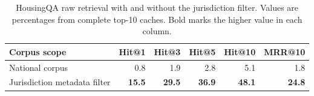 \begin{table}[H]
\centering
\caption{HousingQA raw retrieval with and without the jurisdiction filter. Values are percentages from complete top-10 caches. Bold marks the higher value in each column.}
\label{tab:housing_metadata_filter}
\footnotesize
\begin{tabular}{lrrrrr}
\toprule
Corpus scope & Hit@1 & Hit@3 & Hit@5 & Hit@10 & MRR@10 \\
\midrule
National corpus & 0.8 & 1.9 & 2.8 & 5.1 & 1.8 \\
Jurisdiction metadata filter & \textbf{15.5} & \textbf{29.5} & \textbf{36.9} & \textbf{48.1} & \textbf{24.8} \\
\bottomrule
\end{tabular}
\end{table}
